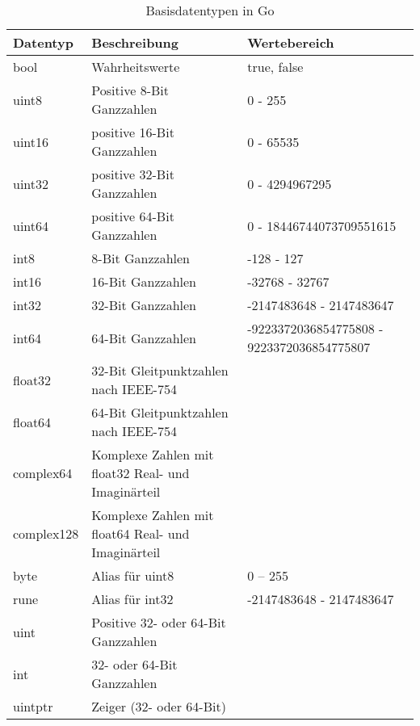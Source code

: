 \begin{table}[H]
    \centering
    \begin{tabularx}{\textwidth}{|l|X|X|}
    \hline 
    \rowcolor[gray]{0.75} \textbf{Datentyp} & \textbf{Beschreibung} & \textbf{Wertebereich} \\
    \hline
    bool & Wahrheitswerte & true, false \\
    \hline
    uint8 & Positive 8-Bit Ganzzahlen & 0 - 255 \\
    \hline
    uint16 & positive 16-Bit Ganzzahlen & 0 - 65535 \\
    \hline
    uint32 & positive 32-Bit Ganzzahlen	& 0 - 4294967295 \\
    \hline
    uint64 & positive 64-Bit Ganzzahlen	& 0 - 18446744073709551615 \\
    \hline
    int8 & 8-Bit Ganzzahlen & -128 - 127 \\
    \hline
    int16 & 16-Bit Ganzzahlen & -32768 - 32767 \\
    \hline
    int32 & 32-Bit Ganzzahlen & -2147483648 - 2147483647 \\
    \hline
    int64 & 64-Bit Ganzzahlen & -9223372036854775808 - 9223372036854775807 \\
    \hline
    float32 & 32-Bit Gleitpunktzahlen nach IEEE-754	& \\
    \hline
    float64 & 64-Bit Gleitpunktzahlen nach IEEE-754	& \\
    \hline
    complex64 & Komplexe Zahlen mit float32 Real- und Imaginärteil & \\
    \hline
    complex128 & Komplexe Zahlen mit float64 Real- und Imaginärteil & \\
    \hline
    byte & Alias für uint8 & 0 – 255 \\
    \hline
    rune & Alias für int32 & -2147483648 - 2147483647 \\
    \hline
    uint & Positive 32- oder 64-Bit Ganzzahlen & \\
    \hline
    int & 32- oder 64-Bit Ganzzahlen & \\	
    \hline
    uintptr & Zeiger (32- oder 64-Bit) & \\	
    \hline
    \end{tabularx}
    \caption{Basisdatentypen in Go}
    \label{tab:DatentypenGo}
\end{table}

